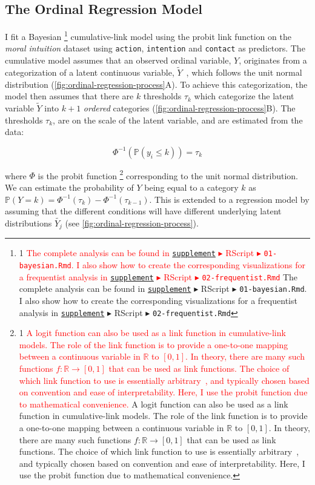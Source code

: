 \documentclass{vgtc}                          %
\def\trackchanges{0}
\newcommand{\new}[1]{%
\if\trackchanges1%
\textcolor{red}{#1}%
\else#1\fi}
\newcommand{\supplement}{\href{https://osf.io/cdgby/}{\texttt{supplement}}}
\begin{document}
\subsection{The Ordinal Regression Model}
I fit a Bayesian%
\footnote{\new{The complete analysis can be found in \supplement{} $\blacktriangleright$ RScript $\blacktriangleright$ \texttt{01-bayesian.Rmd}. I also show how to create the corresponding visualizations for a frequentist analysis in \supplement{} $\blacktriangleright$ RScript $\blacktriangleright$ \texttt{02-frequentist.Rmd}}}
cumulative-link model using the probit link function on the \textit{moral intuition} dataset using \texttt{action}, \texttt{intention} and \texttt{contact} as predictors. The cumulative model assumes that an observed ordinal variable, $Y$, originates from a categorization of a latent continuous variable, $\tilde{Y}$~\cite{burkner_ordinal_2019, victorsyiem_better_2026}, which follows the unit normal distribution (\autoref{fig:ordinal-regression-process}A). To achieve this categorization, the model then assumes that there are $k$ thresholds $\tau_k$ which categorize the latent variable $\tilde{Y}$ into $k + 1$ \textit{ordered} categories (\autoref{fig:ordinal-regression-process}B). The thresholds $\tau_k$, are on the scale of the latent variable, and are estimated from the data:

\vspace{-6pt}
\[ \Phi^{-1}(\mathbb{P}(y_i \leq k)) = \tau_k \]
\vspace{-12pt}

\noindent where $\Phi$ is the probit function%
\footnote{\new{
A logit function can also be used as a link function in cumulative-link models. The role of the link function is to provide a one-to-one mapping between a continuous variable in $\mathbb{R}$ to $[0, 1]$. In theory, there are many such functions $f: \mathbb{R} \rightarrow [0, 1]$ that can be used as link functions. The choice of which link function to use is essentially arbitrary~\cite{yang_subjective_2023}, and typically chosen based on convention and ease of interpretability. Here, I use the probit function due to mathematical convenience.
}}
corresponding to the unit normal distribution. We can estimate the probability of $Y$ being equal to a category $k$ as $\mathbb{P}(Y = k) = \Phi^{-1}(\tau_k) - \Phi^{-1}(\tau_{k-1})$. This is extended to a regression model by assuming that the different conditions will have different underlying latent distributions $\tilde{Y_j}$ (see \autoref{fig:ordinal-regression-process}).
\end{document}
